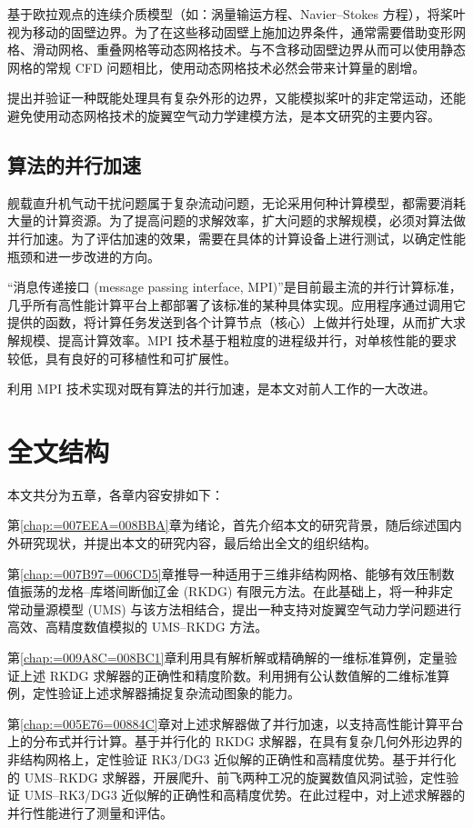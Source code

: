 基于欧拉观点的连续介质模型（如：涡量输运方程、Navier–Stokes 方程），将桨叶视为移动的固壁边界。为了在这些移动固壁上施加边界条件，通常需要借助变形网格、滑动网格、重叠网格等动态网格技术。与不含移动固壁边界从而可以使用静态网格的常规
CFD 问题相比，使用动态网格技术必然会带来计算量的剧增。

提出并验证一种既能处理具有复杂外形的边界，又能模拟桨叶的非定常运动，还能避免使用动态网格技术的旋翼空气动力学建模方法，是本文研究的主要内容。

\subsection{算法的并行加速}

舰载直升机气动干扰问题属于复杂流动问题，无论采用何种计算模型，都需要消耗大量的计算资源。为了提高问题的求解效率，扩大问题的求解规模，必须对算法做并行加速。为了评估加速的效果，需要在具体的计算设备上进行测试，以确定性能瓶颈和进一步改进的方向。

“消息传递接口 (message passing interface, MPI)”是目前最主流的并行计算标准，几乎所有高性能计算平台上都部署了该标准的某种具体实现。应用程序通过调用它提供的函数，将计算任务发送到各个计算节点（核心）上做并行处理，从而扩大求解规模、提高计算效率。MPI
技术基于粗粒度的进程级并行，对单核性能的要求较低，具有良好的可移植性和可扩展性。

利用 MPI 技术实现对既有算法的并行加速，是本文对前人工作的一大改进。

\section{全文结构}

本文共分为五章，各章内容安排如下：

第\ref{chap:=007EEA=008BBA}章为绪论，首先介绍本文的研究背景，随后综述国内外研究现状，并提出本文的研究内容，最后给出全文的组织结构。

第\ref{chap:=007B97=006CD5}章推导一种适用于三维非结构网格、能够有效压制数值振荡的龙格–库塔间断伽辽金 (RKDG)
有限元方法。在此基础上，将一种非定常动量源模型 (UMS) 与该方法相结合，提出一种支持对旋翼空气动力学问题进行高效、高精度数值模拟的
UMS–RKDG 方法。

第\ref{chap:=009A8C=008BC1}章利用具有解析解或精确解的一维标准算例，定量验证上述 RKDG 求解器的正确性和精度阶数。利用拥有公认数值解的二维标准算例，定性验证上述求解器捕捉复杂流动图象的能力。

第\ref{chap:=005E76=00884C}章对上述求解器做了并行加速，以支持高性能计算平台上的分布式并行计算。基于并行化的
RKDG 求解器，在具有复杂几何外形边界的非结构网格上，定性验证 RK3/DG3 近似解的正确性和高精度优势。基于并行化的 UMS–RKDG
求解器，开展爬升、前飞两种工况的旋翼数值风洞试验，定性验证 UMS–RK3/DG3 近似解的正确性和高精度优势。在此过程中，对上述求解器的并行性能进行了测量和评估。

